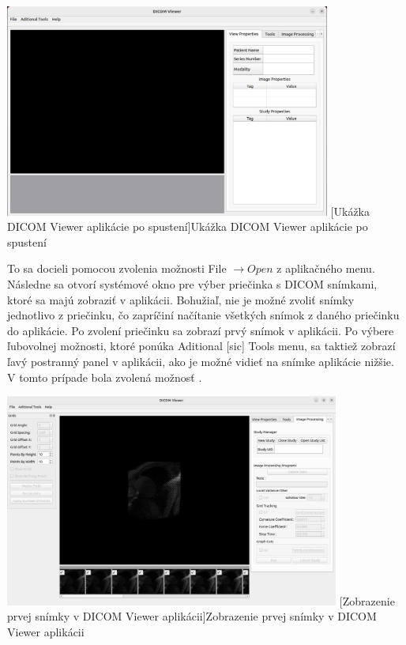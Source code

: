 {\clearpage

\begin {center}
        \centering
        \includegraphics[height=7cm]{media/existing_app/init.png}
        \captionsetup{justification=centering}
        [Ukážka DICOM Viewer aplikácie po spustení]{Ukážka DICOM Viewer aplikácie po spustení}
\end {center}

To sa docieli pomocou zvolenia možnosti File $\rightarrow{ Open}$ z aplikačného menu. Následne sa otvorí systémové okno pre výber priečinka s DICOM snímkami, ktoré sa majú zobraziť v aplikácii. Bohužiaľ, nie je možné zvoliť snímky jednotlivo z priečinku, čo zapríčiní načítanie všetkých snímok z daného priečinku do aplikácie. Po zvolení priečinku sa zobrazí prvý snímok v aplikácii. Po výbere ľubovolnej možnosti, ktoré ponúka Aditional [sic] Tools menu, sa taktiež zobrazí ľavý postranný panel v aplikácii, ako je možné vidieť na snímke aplikácie nižšie. V tomto prípade bola zvolená možnosť .

\begin {center}
        \centering
        \includegraphics[height=7cm]{media/existing_app/app_with_grids_panel.png}
        \captionsetup{justification=centering}
        [Zobrazenie prvej snímky v DICOM Viewer aplikácii]{Zobrazenie prvej snímky v DICOM Viewer aplikácii}
\end {center}

}
